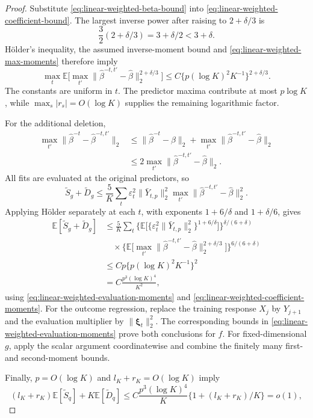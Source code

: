 \documentclass[12pt]{article}
\def\E{\mathbb{E}}
\numberwithin{equation}{section}
\begin{document}
\begin{proof}
Substitute \eqref{eq:linear-weighted-beta-bound} into
\eqref{eq:linear-weighted-coefficient-bound}.
The largest inverse power after raising to $2+\delta/3$ is
\[
\frac32(2+\delta/3)
=3+\delta/2<3+\delta.
\]
H\"older's inequality, the assumed inverse-moment bound and
\eqref{eq:linear-weighted-max-moments} therefore imply
\begin{equation}
\label{eq:linear-weighted-coefficient-moments}
\max_t
\E\big[
\max_{t'}
\|\hat\beta^{-t,t'}-\hat\beta\|_2^{2+\delta/3}
\big]
\leq
C\big\{
p(\log K)^2K^{-1}
\big\}^{2+\delta/3}.
\end{equation}
The constants are uniform in $t$.
The predictor maxima contribute at most $p\log K$, while
$\max_s|r_s|=O(\log K)$ supplies the remaining logarithmic
factor.

For the additional deletion,
\begin{align*}
\max_{t'}
\|\hat\beta^{-t}-\hat\beta^{-t,t'}\|_2
&\leq
\|\hat\beta^{-t}-\hat\beta\|_2
+\max_{t'}
\|\hat\beta^{-t,t'}-\hat\beta\|_2\\
&\leq
2\max_{t'}
\|\hat\beta^{-t,t'}-\hat\beta\|_2.
\end{align*}
All fits are evaluated at the original predictors, so
\begin{equation}
\label{eq:linear-weighted-prediction-deletion}
\tilde S_g+\tilde D_g
\leq
\frac5K\sum_t
\varepsilon_t^2\|\bar Y_{t,p}\|_2^2
\max_{t'}
\|\hat\beta^{-t,t'}-\hat\beta\|_2^2.
\end{equation}
Applying H\"older separately at each $t$, with exponents
$1+6/\delta$ and $1+\delta/6$, gives
\begin{align*}
\E[\tilde S_g+\tilde D_g]
&\leq
\frac5K\sum_t
\bigg\{
\E\Big[
\{\varepsilon_t^2\|\bar Y_{t,p}\|_2^2\}^{1+6/\delta}
\Big]
\bigg\}^{\delta/(6+\delta)}\\
&\quad{}\times
\bigg\{
\E\Big[
\max_{t'}
\|\hat\beta^{-t,t'}-\hat\beta\|_2^{2+\delta/3}
\Big]
\bigg\}^{6/(6+\delta)}\\
&\leq
Cp\big\{
p(\log K)^2K^{-1}
\big\}^2\\
&=
C\frac{p^3(\log K)^4}{K^2},
\end{align*}
using
\eqref{eq:linear-weighted-evaluation-moments} and
\eqref{eq:linear-weighted-coefficient-moments}.
For the outcome regression, replace the training response
$X_j$ by $Y_{j+1}$ and the evaluation multiplier by
$\|\boldsymbol\xi_t\|_2^2$.
The corresponding bounds in
\eqref{eq:linear-weighted-evaluation-moments} prove both
conclusions for $f$.
For fixed-dimensional $g$, apply the scalar argument
coordinatewise and combine the finitely many first- and
second-moment bounds.

Finally, $p=O(\log K)$ and $l_K+r_K=O(\log K)$ imply
\[
(l_K+r_K)\E[\tilde S_q]+K\E[\tilde D_q]
\leq
C\frac{p^3(\log K)^4}{K}
\big\{1+(l_K+r_K)/K\big\}
=o(1),
\]
\end{proof}
\end{document}
